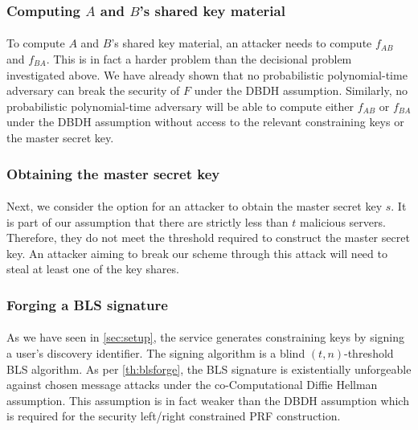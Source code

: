 \subsubsection{Computing $A$ and $B$'s shared key material}

\paragraph{} To compute $A$ and $B$'s shared key material, an attacker needs to compute $f_{AB}$ and $f_{BA}$. This is in fact a harder problem than the decisional problem investigated above. We have already shown that no probabilistic polynomial-time adversary can break the security of $F$ under the DBDH assumption. Similarly, no probabilistic polynomial-time adversary will be able to compute either $f_{AB}$ or $f_{BA}$ under the DBDH assumption without access to the relevant constraining keys or the master secret key.

\subsubsection{Obtaining the master secret key}

\paragraph{} Next, we consider the option for an attacker to obtain the master secret key $s$. It is part of our assumption that there are strictly less than $t$ malicious servers. Therefore, they do not meet the threshold required to construct the master secret key. An attacker aiming to break our scheme through this attack will need to steal at least one of the key shares.

\subsubsection{Forging a BLS signature}

\paragraph{} As we have seen in \autoref{sec:setup}, the service generates constraining keys by signing a user's discovery identifier. The signing algorithm is a blind $(t,n)$-threshold BLS algorithm. As per \autoref{th:blsforge}, the BLS signature is existentially unforgeable against chosen message attacks under the co-Computational Diffie Hellman assumption. This assumption is in fact weaker than the DBDH assumption which is required for the security left/right constrained PRF construction.


